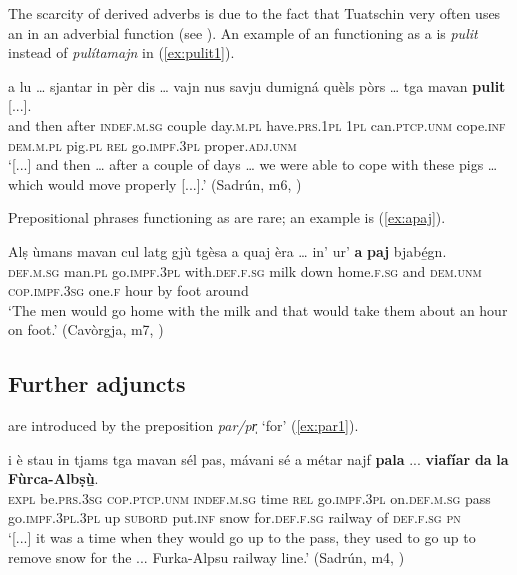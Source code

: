 The scarcity of derived adverbs is due to the fact that Tuatschin very often uses an  in an adverbial function (see ). An example of an  functioning as a  is \textit{pulit} instead of \textit{pulítamajn} in (\ref{ex:pulit1}).

\ea
\label{ex:pulit1}
\gll [...] a lu … sjantar in pèr dis … vajn nus savju dumigná quèls pòrs … tga mavan \textbf{pulit} [...].\\
{} and then {} after \textsc{indef.m.sg} couple day.\textsc{m.pl} {} have.\textsc{prs.1pl} \textsc{1pl} can.\textsc{ptcp.unm} cope.\textsc{inf} \textsc{dem.m.pl} pig.\textsc{pl} {} \textsc{rel}  go.\textsc{impf.3pl} proper.\textsc{adj.unm} \\
\glt `[...] and then … after a couple of days … we were able to cope with these pigs … which would move properly [...].' (Sadrún, m6, )
\z

Prepositional phrases functioning as  are rare; an example is (\ref{ex:apaj}).

\ea
\label{ex:apaj}
\gll Alṣ ùmans mavan cul latg gjù tgèsa a quaj èra … in' ur’ \textbf{a} \textbf{paj} bjabé̱gn.\\
\textsc{def.m.sg} man.\textsc{pl} go.\textsc{impf.3pl} with.\textsc{def.f.sg} milk down home.\textsc{f.sg} and \textsc{dem.unm} \textsc{cop.impf.3sg} {} one.\textsc{f} hour by foot around\\
\glt `The men would go home with the milk and that would take them about an hour on foot.' (Cavòrgja, m7, )
\z

\subsection{Further adjuncts}\label{sec:4.3.4}

 are introduced by the preposition \textit{par/pr̩} `for' (\ref{ex:par1}).

\ea
\label{ex:par1}
\gll   [...] i è stau in tjams tga mavan sél pas, mávani sé a métar najf \textbf{pala} ... \textbf{viafíar} \textbf{da} \textbf{la} \textbf{Fùrca-Albṣù̱}. \\
{} \textsc{expl} be.\textsc{prs.3sg} \textsc{cop.ptcp.unm} \textsc{indef.m.sg} time \textsc{rel} go.\textsc{impf.3pl} on.\textsc{def.m.sg} pass go.\textsc{impf.3pl.3pl} up \textsc{subord} put.\textsc{inf} snow for.\textsc{def.f.sg} {} railway of \textsc{def.f.sg} \textsc{pn}\\
\glt `[...] it was a time when they would go up to the pass, they used to go up to remove snow for the ... Furka-Alpsu railway line.' (Sadrún, m4, )
\z

